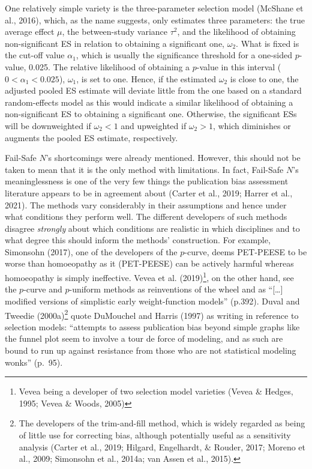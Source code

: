\documentclass[
  man,floatsintext]{apa6}
\begin{document}
One relatively simple variety is the three-parameter selection model (McShane et al., 2016), which, as the name suggests, only estimates three parameters: the true average effect \(\mu\), the between-study variance \(\tau^2\), and the likelihood of obtaining non-significant ES in relation to obtaining a significant one, \(\omega_2%
\). What is fixed is the cut-off value \(\alpha_1\), which is usually the significance threshold for a one-sided \(p\)-value, 0.025. The relative likelihood of obtaining a \(p\)-value in this interval (\(0<\alpha_1<0.025\)), \(\omega_1%
\), is set to one. Hence, if the estimated \(\omega_2\) is close to one, the adjusted pooled ES estimate will deviate little from the one based on a standard random-effects model as this would indicate a similar likelihood of obtaining a non-significant ES to obtaining a significant one. Otherwise, the significant ESs will be downweighted if \(\omega_2 < 1\) and upweighted if \(\omega_2 > 1\), which diminishes or augments the pooled ES estimate, respectively.

Fail-Safe \(N\)'s shortcomings were already mentioned. However, this should not be taken to mean that it is the only method with limitations. In fact, Fail-Safe \(N\)'s meaninglessness is one of the very few things the publication bias assessment literature appears to be in agreement about (Carter et al., 2019; Harrer et al., 2021). The methods vary considerably in their assumptions and hence under what conditions they perform well. The different developers of such methods disagree \emph{strongly} about which conditions are realistic in which disciplines and to what degree this should inform the methods' construction. For example, Simonsohn (2017), one of the developers of the \(p\)-curve, deems PET-PEESE to be worse than homoeopathy as it (PET-PEESE) can be actively harmful whereas homoeopathy is simply ineffective. Vevea et al. (2019)\footnote{Vevea being a developer of two selection model varieties (Vevea \& Hedges, 1995; Vevea \& Woods, 2005)}, on the other hand, see the \(p\)-curve and \(p\)-uniform methods as reinventions of the wheel and as ``{[}\ldots{]} modified versions of simplistic early weight-function models'' (p.392). Duval and Tweedie (2000a)\footnote{The developers of the trim-and-fill method, which is widely regarded as being of little use for correcting bias, although potentially useful as a sensitivity analysis (Carter et al., 2019; Hilgard, Engelhardt, \& Rouder, 2017; Moreno et al., 2009; Simonsohn et al., 2014a; van Assen et al., 2015).} quote DuMouchel and Harris (1997) as writing in reference to selection models: ``attempts to assess publication bias beyond simple graphs like the funnel plot seem to involve a tour de force of modeling, and as such are bound to run up against resistance from those who are not statistical modeling wonks'' (p.~95).
\end{document}
